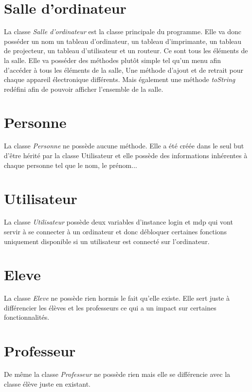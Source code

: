 \documentclass[12,french]{report}
\begin{document}
\section{Salle d'ordinateur}

La classe \textit{Salle d'ordinateur} est la classe principale du programme. Elle va donc posséder un nom un tableau d'ordinateur, un tableau d'imprimante, un tableau de projecteur, un tableau d'utilisateur et un routeur. Ce sont tous les éléments de la salle. Elle va posséder des méthodes plutôt simple tel qu'un menu afin d'accéder à tous les éléments de la salle, Une méthode d'ajout et de retrait pour chaque appareil électronique différents. Mais également une méthode \textit{toString} redéfini afin de pouvoir afficher l'ensemble de la salle.

\section{Personne}

La classe \textit{Personne} ne possède aucune méthode. Elle a été créée dans le seul but d'être hérité par la classe Utilisateur et elle possède des informations inhérentes à chaque personne tel que le nom, le prénom... 

\section{Utilisateur}

La classe \textit{Utilisateur} possède deux variables d'instance login et mdp qui vont servir à  se connecter à un ordinateur et donc débloquer certaines fonctions uniquement disponible si un utilisateur est connecté sur l'ordinateur.

\section{Eleve}

La classe \textit{Eleve} ne possède rien hormis le fait qu'elle existe. Elle sert juste à différencier les élèves et les professeurs ce qui a un impact sur certaines fonctionnalités.

\section{Professeur}

De même la classe \textit{Professeur} ne possède rien mais elle se différencie avec la classe élève juste en existant.
\end{document}
